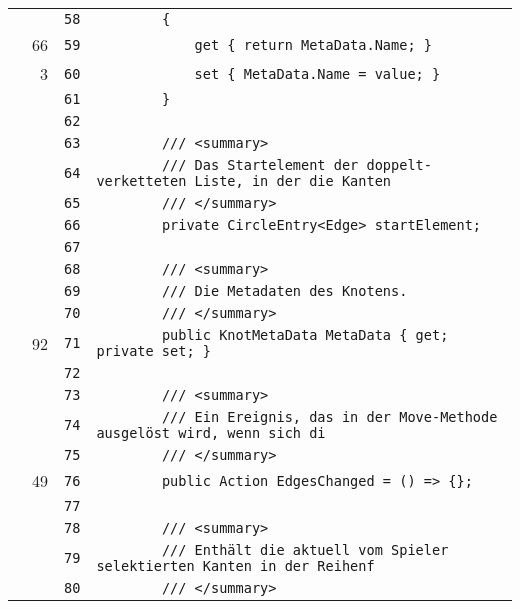 \documentclass[a4paper,10pt]{article}
\begin{document}
\begin{longtable}[l]{lrrl}
\cellcolor{gray} &  & \verb~58~ & \verb~        {~\\
\cellcolor{green} & 66 & \verb~59~ & \verb~            get { return MetaData.Name; }~\\
\cellcolor{green} & 3 & \verb~60~ & \verb~            set { MetaData.Name = value; }~\\
\cellcolor{gray} &  & \verb~61~ & \verb~        }~\\
\cellcolor{gray} &  & \verb~62~ & \verb~~\\
\cellcolor{gray} &  & \verb~63~ & \verb~        /// <summary>~\\
\cellcolor{gray} &  & \verb~64~ & \verb~        /// Das Startelement der doppelt-verketteten Liste, in der die Kanten ~\\
\cellcolor{gray} &  & \verb~65~ & \verb~        /// </summary>~\\
\cellcolor{gray} &  & \verb~66~ & \verb~        private CircleEntry<Edge> startElement;~\\
\cellcolor{gray} &  & \verb~67~ & \verb~~\\
\cellcolor{gray} &  & \verb~68~ & \verb~        /// <summary>~\\
\cellcolor{gray} &  & \verb~69~ & \verb~        /// Die Metadaten des Knotens.~\\
\cellcolor{gray} &  & \verb~70~ & \verb~        /// </summary>~\\
\cellcolor{green} & 92 & \verb~71~ & \verb~        public KnotMetaData MetaData { get; private set; }~\\
\cellcolor{gray} &  & \verb~72~ & \verb~~\\
\cellcolor{gray} &  & \verb~73~ & \verb~        /// <summary>~\\
\cellcolor{gray} &  & \verb~74~ & \verb~        /// Ein Ereignis, das in der Move-Methode ausgelöst wird, wenn sich di~\\
\cellcolor{gray} &  & \verb~75~ & \verb~        /// </summary>~\\
\cellcolor{green} & 49 & \verb~76~ & \verb~        public Action EdgesChanged = () => {};~\\
\cellcolor{gray} &  & \verb~77~ & \verb~~\\
\cellcolor{gray} &  & \verb~78~ & \verb~        /// <summary>~\\
\cellcolor{gray} &  & \verb~79~ & \verb~        /// Enthält die aktuell vom Spieler selektierten Kanten in der Reihenf~\\
\cellcolor{gray} &  & \verb~80~ & \verb~        /// </summary>~\\

\end{longtable}
\end{document}
